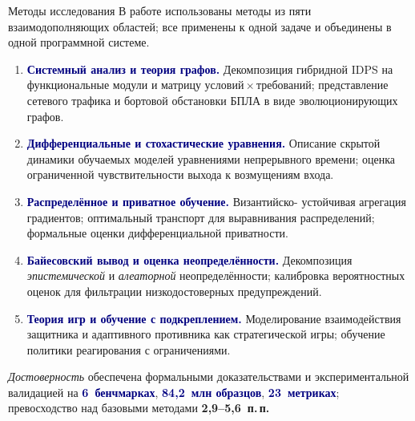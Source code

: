 \documentclass[10pt,aspectratio=169]{beamer}
\newcommand{\hl}[1]{\textcolor{accent}{\textbf{#1}}}
\newcommand{\bn}[1]{\textcolor{navy}{\textbf{#1}}}
\begin{document}
\begin{frame}{Методы исследования}
\footnotesize
В работе использованы методы из пяти взаимодополняющих
областей; все применены к одной задаче и объединены в одной
программной системе.
\smallskip
\begin{enumerate}\setlength\itemsep{2pt}

\item \bn{Системный анализ и теория графов.} Декомпозиция
гибридной IDPS на функциональные модули и матрицу
условий\,$\times$\,требований; представление сетевого
трафика и бортовой обстановки БПЛА в виде эволюционирующих
графов.

\item \bn{Дифференциальные и стохастические уравнения.}
Описание скрытой динамики обучаемых моделей уравнениями
непрерывного времени; оценка ограниченной чувствительности
выхода к возмущениям входа.

\item \bn{Распределённое и приватное обучение.} Византийско-
устойчивая агрегация градиентов; оптимальный транспорт
для выравнивания распределений; формальные оценки
дифференциальной приватности.

\item \bn{Байесовский вывод и оценка неопределённости.}
Декомпозиция \emph{эпистемической} и \emph{алеаторной}
неопределённости; калибровка вероятностных оценок для
фильтрации низкодостоверных предупреждений.

\item \bn{Теория игр и обучение с подкреплением.}
Моделирование взаимодействия защитника и адаптивного
противника как стратегической игры; обучение политики
реагирования с ограничениями.

\end{enumerate}
\smallskip
\begin{block}{}
\scriptsize \emph{Достоверность} обеспечена формальными
доказательствами и экспериментальной валидацией на
\bn{6~бенчмарках}, \bn{84{,}2~млн образцов},
\bn{23~метриках}; превосходство над базовыми методами
\hl{2{,}9--5{,}6~п.\,п.}
\end{block}
\end{frame}
\end{document}
